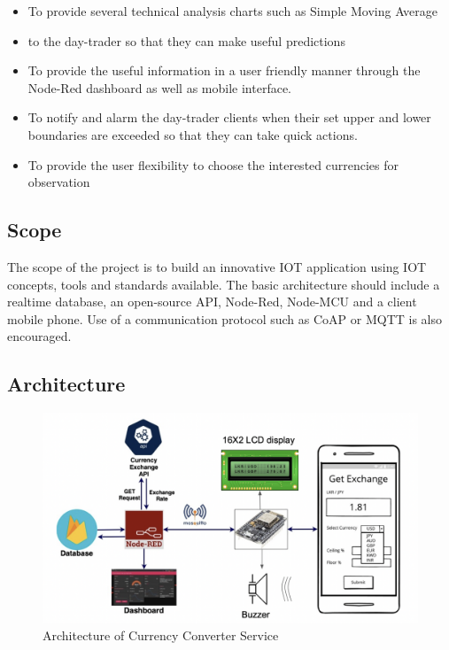 \begin{itemize}[itemsep=-1.7mm]

\item To provide several technical analysis charts such as Simple Moving Average \item to the day-trader so that they can make useful predictions
\item To provide the useful information in a user friendly manner through the Node-Red dashboard as well as mobile interface.
\item To notify and alarm the day-trader clients when their set upper and lower boundaries are exceeded so that they can take quick actions.
\item To provide the user flexibility to choose the interested currencies for observation


\end{itemize}


\subsection{Scope}

The scope of the project is to build an innovative IOT application using IOT concepts, tools and standards available. The basic architecture should include a realtime database, an open-source API, Node-Red, Node-MCU and a client mobile phone. Use of a communication protocol such as CoAP or MQTT is also encouraged.


\subsection{Architecture}

\begin{figure}[h]
    \centering
      \includegraphics[width=1\textwidth]{images/arch.png}
    \caption{Architecture of Currency Converter Service}
    \label{fig:orgchart}
\end{figure}